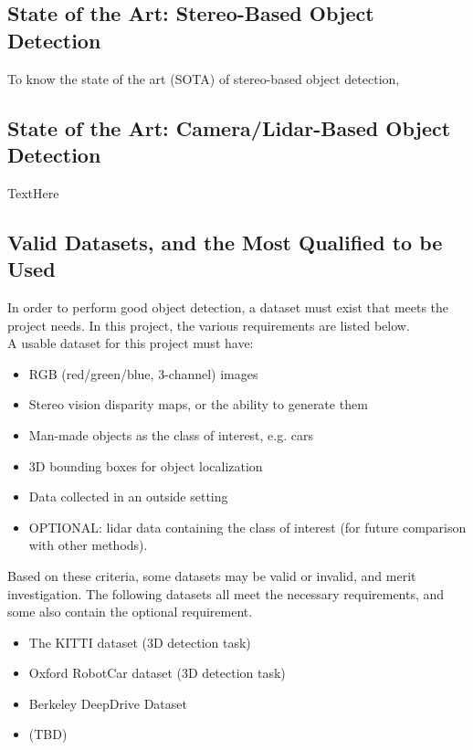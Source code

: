 \subsection{State of the Art: Stereo-Based Object Detection}
To know the state of the art (SOTA) of stereo-based object detection, 

\subsection{State of the Art: Camera/Lidar-Based Object Detection}
TextHere

\subsection{Valid Datasets, and the Most Qualified to be Used}
In order to perform good object detection, a dataset must exist that meets the project needs. In this project, the various requirements are listed below. \\

A usable dataset for this project must have: 
\begin{itemize} \itemsep=-0.5em
    \item RGB (red/green/blue, 3-channel) images
    \item Stereo vision disparity maps, or the ability to generate them
    \item Man-made objects as the class of interest, e.g. cars
    \item 3D bounding boxes for object localization
    \item Data collected in an outside setting
    \item OPTIONAL: lidar data containing the class of interest (for future comparison with other methods).
\end{itemize}

Based on these criteria, some datasets may be valid or invalid, and merit investigation. The following datasets all meet the necessary requirements, and some also contain the optional requirement.
\begin{itemize} \itemsep=-0.5em
    \item The KITTI dataset (3D detection task)
    \item Oxford RobotCar dataset (3D detection task)
    \item Berkeley DeepDrive Dataset
    \item (TBD)
\end{itemize}


